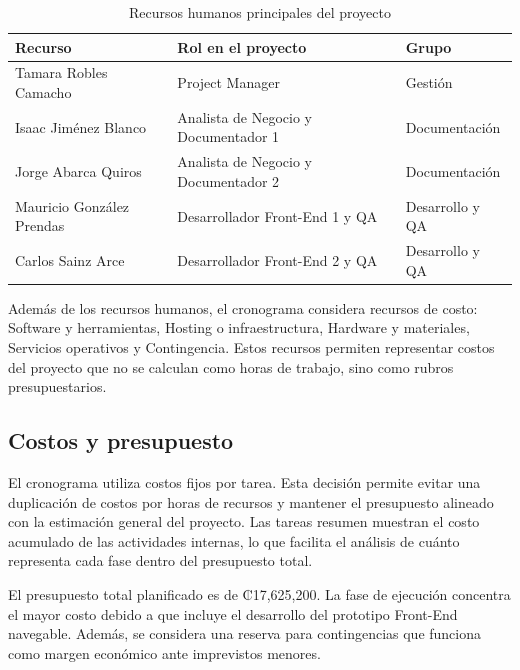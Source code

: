 \documentclass[11pt,spanish]{article}
\begin{document}
\begin{table}[H]
\centering
\caption{Recursos humanos principales del proyecto}
\begin{tabularx}{\textwidth}{p{5cm} Y p{3.8cm}}
\toprule
\textbf{Recurso} & \textbf{Rol en el proyecto} & \textbf{Grupo} \\
\midrule
Tamara Robles Camacho & Project Manager & Gestión \\
Isaac Jiménez Blanco & Analista de Negocio y Documentador 1 & Documentación \\
Jorge Abarca Quiros & Analista de Negocio y Documentador 2 & Documentación \\
Mauricio González Prendas & Desarrollador Front-End 1 y QA & Desarrollo y QA \\
Carlos Sainz Arce & Desarrollador Front-End 2 y QA & Desarrollo y QA \\
\bottomrule
\end{tabularx}
\end{table}

Además de los recursos humanos, el cronograma considera recursos de costo: Software y herramientas, Hosting o infraestructura, Hardware y materiales, Servicios operativos y Contingencia. Estos recursos permiten representar costos del proyecto que no se calculan como horas de trabajo, sino como rubros presupuestarios.

\subsection{Costos y presupuesto}

El cronograma utiliza costos fijos por tarea. Esta decisión permite evitar una duplicación de costos por horas de recursos y mantener el presupuesto alineado con la estimación general del proyecto. Las tareas resumen muestran el costo acumulado de las actividades internas, lo que facilita el análisis de cuánto representa cada fase dentro del presupuesto total.

El presupuesto total planificado es de ₡17,625,200. La fase de ejecución concentra el mayor costo debido a que incluye el desarrollo del prototipo Front-End navegable. Además, se considera una reserva para contingencias que funciona como margen económico ante imprevistos menores.
\end{document}
